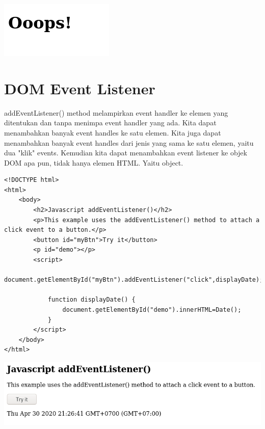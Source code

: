 \documentclass[a4paper,12pt]{article}
\begin{document}
\begin{center}
    \includegraphics[scale=.7]{5.png} 
\end{center}

\section*{DOM Event Listener}
addEventListener() method melampirkan event handler ke elemen yang ditentukan dan tanpa menimpa event handler yang ada. Kita dapat menambahkan banyak event handles ke satu elemen. Kita juga dapat menambahkan banyak event handles dari jenis yang sama ke satu elemen, yaitu dua "klik" events. Kemudian kita dapat menambahkan event listener ke objek DOM apa pun, tidak hanya elemen HTML. Yaitu object.
\begin{lstlisting}
<!DOCTYPE html>
<html>
    <body>
        <h2>Javascript addEventListener()</h2>
        <p>This example uses the addEventListener() method to attach a click event to a button.</p>
        <button id="myBtn">Try it</button>
        <p id="demo"></p>
        <script>
            document.getElementById("myBtn").addEventListener("click",displayDate);

            function displayDate() {
                document.getElementById("demo").innerHTML=Date();
            }
        </script>
    </body>
</html>
\end{lstlisting}

\begin{center}
    \includegraphics[scale=.7]{6.png} 
\end{center}
\end{document}
